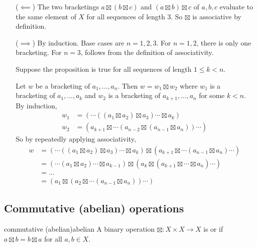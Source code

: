 \documentclass[12pt,letterpaper]{report}
\begin{document}
\begin{thmproof}
  \begin{itemize}[leftmargin=4em]
    \item[($\impliedby$)]
    The two bracketings $a \boxtimes (b \boxtimes c)$ and $(a \boxtimes b) \boxtimes c$ of $a, b, c$
    evaluate to the same element of $X$ for all sequences of length 3.
    So $\boxtimes$ is associative by definition.

    \item[($\implies$)]
    By induction.
    Base cases are $n = 1, 2, 3$.
    For $n = 1, 2$, there is only one bracketing.
    For $n = 3$, follows from the definition of associativity.

    Suppose the proposition is true for all sequences of length $1 \leq k < n$.

    Let $w$ be a bracketing of $a_1, \ldots, a_n$.
    Then $w = w_1 \boxtimes w_2$ where $w_1$ is a bracketing of $a_1, \ldots, a_k$ and $w_2$ is a
    bracketing of $a_{k + 1}, \ldots, a_n$ for some $k < n$.
    By induction,
    \begin{align*}
      w_1 &= (\cdots ((a_1 \boxtimes a_2) \boxtimes a_3) \cdots \boxtimes a_k) \\
      w_2 &= (a_{k + 1} \boxtimes \cdots (a_{n - 2} \boxtimes (a_{n - 1} \boxtimes a_n)) \cdots)
    \end{align*}
    So by repeatedly applying associativity,
    \begin{align*}
      w
      &= (\cdots ((a_1 \boxtimes a_2) \boxtimes a_3) \cdots \boxtimes a_k) \boxtimes
        (a_{k + 1} \boxtimes \cdots (a_{n - 1} \boxtimes a_n) \cdots) \\
      &= (\cdots (a_1 \boxtimes a_2) \cdots \boxtimes a_{k - 1}) \boxtimes
        (a_k \boxtimes (a_{k + 1} \boxtimes \cdots \boxtimes a_n) \cdots) \\
      &= \ldots \\
      &= (a_1 \boxtimes (a_2 \boxtimes \cdots (a_{n - 1} \boxtimes a_n)) \cdots)
    \end{align*}
  \end{itemize}
\end{thmproof}

\pagebreak
\subsection{Commutative (abelian) operations}

\begin{defn}{commutative (abelian)}{abelian}
  A binary operation $\boxtimes \colon X \times X \to X$ is  or 
  if $a \boxtimes b = b \boxtimes a$ for all $a, b \in X$.
\end{defn}
\end{document}
